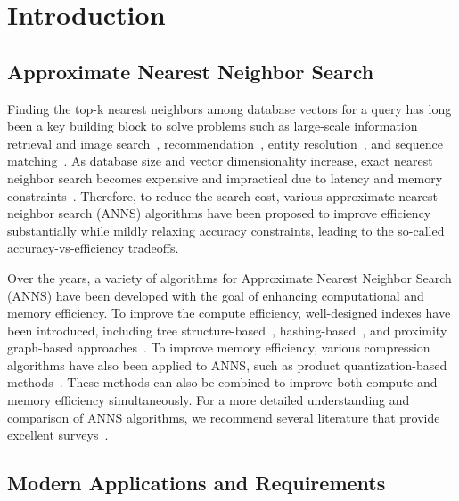 \section{Introduction}\label{minjia_sec:intro}

\subsection{Approximate Nearest Neighbor Search}

Finding the top-k nearest neighbors among database vectors for a query has long been a key building block to solve problems such as large-scale information retrieval and image search~\cite{lv2004image, philbin2007object, kulis2009kernelized}, recommendation~\cite{das2007google}, entity resolution~\cite{hoffart2012kore}, and sequence matching~\cite{berlin2015assembling}. As database size and vector dimensionality increase, exact nearest neighbor search becomes expensive and impractical due to latency and memory constraints~\cite{weber1998quantitative, beyer1999nearest, bohm2001searching}. Therefore, to reduce the search cost, various approximate nearest neighbor search (ANNS) algorithms have been proposed to improve efficiency substantially while mildly relaxing accuracy constraints, leading to the so-called accuracy-vs-efficiency tradeoffs. 

Over the years, a variety of algorithms for Approximate Nearest Neighbor Search (ANNS) have been developed with the goal of enhancing computational and memory efficiency. To improve the compute efficiency, well-designed indexes have been introduced, including tree structure-based~\cite{kd-tree,r-star-tree,flann}, hashing-based~\cite{lsh}, and proximity graph-based approaches~\cite{hnsw, nsg}. To improve memory efficiency, various compression algorithms have also been applied to ANNS, such as product quantization-based methods~\cite{product-quantization, opq, cartesian-kmeans, inverted-multi-index, lopq}. These methods can also be combined to improve both compute and memory efficiency simultaneously. For a more detailed understanding and comparison of ANNS algorithms, we recommend several literature that provide excellent surveys~\cite{ann-survey,li2020approximate,wang2021comprehensive}.  

\subsection{Modern Applications and Requirements}


